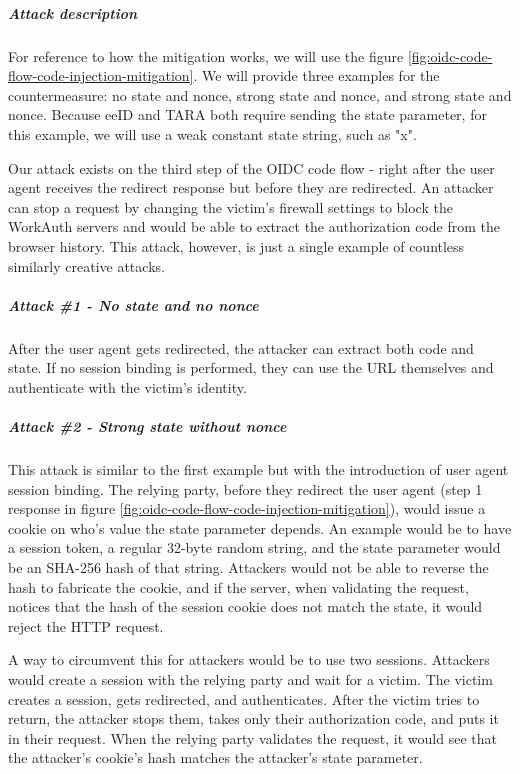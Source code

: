 \subparagraph{Attack description}

For reference to how the mitigation works, we will use the figure \ref{fig:oidc-code-flow-code-injection-mitigation}. We will provide three examples for the countermeasure: no state and nonce, strong state and nonce, and strong state and nonce. Because eeID and TARA both require sending the {state} parameter, for this example, we will use a weak constant state string, such as "x".

Our attack exists on the third step of the OIDC code flow - right after the user agent receives the redirect response but before they are redirected. An attacker can stop a request by changing the victim's firewall settings to block the WorkAuth servers and would be able to extract the authorization code from the browser history. This attack, however, is just a single example of countless similarly creative attacks.

\subparagraph{Attack \#1 - No state and no nonce}

After the user agent gets redirected, the attacker can extract both code and state. If no session binding is performed, they can use the URL themselves and authenticate with the victim's identity.

\subparagraph{Attack \#2 - Strong state without nonce}

This attack is similar to the first example but with the introduction of user agent session binding. The relying party, before they redirect the user agent (step 1 response in figure \ref{fig:oidc-code-flow-code-injection-mitigation}), would issue a cookie on who's value the state parameter depends. An example would be to have a session token, a regular 32-byte random string, and the state parameter would be an {SHA-256} hash of that string. Attackers would not be able to reverse the hash to fabricate the cookie, and if the server, when validating the request, notices that the hash of the session cookie does not match the state, it would reject the HTTP request.

A way to circumvent this for attackers would be to use two sessions. Attackers would create a session with the relying party and wait for a victim. The victim creates a session, gets redirected, and authenticates. After the victim tries to return, the attacker stops them, takes only their authorization code, and puts it in their request. When the relying party validates the request, it would see that the attacker's cookie's hash matches the attacker's state parameter.

